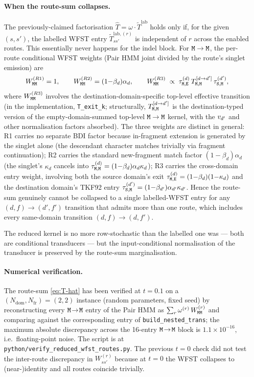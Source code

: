 \paragraph{When the route-sum collapses.}
The previously-claimed factorisation $\hat T = \omega \cdot
\tilde T^{\text{lab}}$ holds only if, for the given $(s, s')$, the
labelled WFST entry $\tilde T^{\text{lab}, (r)}_{ss'}$ is independent
of $r$ across the enabled routes. This essentially never happens for
the indel block. For ${\tt M}\to{\tt M}$, the
per-route conditional WFST weights (Pair HMM joint divided by the
route's singlet emission) are
\[
W^{(R1)}_{{\tt M}{\tt M}} = 1, \qquad
W^{(R2)}_{{\tt M}{\tt M}} = (1{-}\beta_d)\alpha_d, \qquad
W^{(R3)}_{{\tt M}{\tt M}} \;\propto\; \tau^{(d)}_{{\tt M},{\tt E}}\,
   T^{[d \to d']}_{{\tt M},{\tt M}}\,\tau^{(d')}_{{\tt S},{\tt M}},
\]
where $W^{(R3)}_{{\tt M}{\tt M}}$ involves the destination-domain-specific
top-level effective transition (in the implementation,
\texttt{T\_exit\_k}; structurally, $T^{[d\to d']}_{{\tt M},{\tt M}}$
is the destination-typed version of the empty-domain-summed top-level
${\tt M}\to{\tt M}$ kernel, with the $v_{d'}$ and other normalisation
factors absorbed).
The three weights are distinct in general:
R1 carries no separate BDI factor because in-fragment extension is
generated by the singlet alone (the descendant character matches
trivially via fragment continuation); R2 carries the standard
new-fragment match factor $(1{-}\beta_d)\alpha_d$ (the singlet's
$\kappa_d$ cancels into $\tau^{(d)}_{{\tt M},{\tt M}} = (1{-}\beta_d)\alpha_d\kappa_d$);
R3 carries the cross-domain entry weight, involving both the source
domain's exit $\tau^{(d)}_{{\tt M},{\tt E}} = (1{-}\beta_d)(1{-}\kappa_d)$
and the destination domain's TKF92 entry
$\tau^{(d')}_{{\tt S},{\tt M}} = (1{-}\beta_{d'})\alpha_{d'}\kappa_{d'}$.
Hence the route-sum genuinely cannot be collapsed to a single
labelled-WFST entry for any $(d, f) \to (d', f')$ transition that
admits more than one route, which includes every same-domain
transition $(d, f) \to (d, f')$.

The reduced kernel is no more row-stochastic than the labelled one
was --- both are conditional transducers --- but the
input-conditional normalisation of the transducer is preserved by
the route-sum marginalisation.

\paragraph{Numerical verification.}
The route-sum
\eqref{eq:T-hat} has been verified at $t = 0.1$ on a
$(N_\text{dom}, N_\text{fr}) = (2, 2)$ instance (random parameters,
fixed seed) by reconstructing every ${\tt M}\!\to\!{\tt M}$ entry of the
Pair HMM as $\sum_r \omega^{(r)}\,W^{(r)}_{{\tt M}{\tt M}}$ and comparing
against the corresponding entry of \texttt{build\_nested\_trans}; the
maximum absolute discrepancy across the 16-entry ${\tt M}\!\to\!{\tt M}$
block is $1.1 \times 10^{-16}$, i.e.\ floating-point noise. The
script is at \texttt{python/verify\_reduced\_wfst\_routes.py}. The
previous $t = 0$ check did not test the inter-route discrepancy in
$W^{(r)}_{ss'}$ because at $t = 0$ the WFST collapses to (near-)identity
and all routes coincide trivially.

